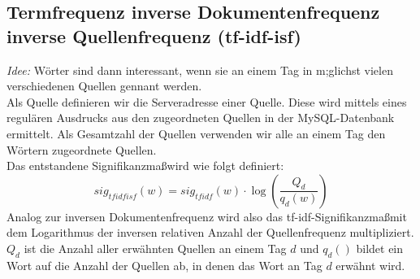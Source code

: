 \subsection{Termfrequenz inverse Dokumentenfrequenz inverse Quellenfrequenz (tf-idf-isf)}
\emph{Idee: } W\"orter sind dann interessant, wenn sie an einem Tag in m;glichst vielen verschiedenen Quellen gennant werden.\\
Als Quelle definieren wir die Serveradresse einer Quelle. Diese wird mittels eines regul\"aren Ausdrucks aus den zugeordneten Quellen in der MySQL-Datenbank ermittelt. Als Gesamtzahl der Quellen verwenden wir alle an einem Tag den W\"ortern zugeordnete Quellen.\\
Das entstandene Signifikanzma\ss wird wie folgt definiert:
 \begin{equation}
sig_{tf idf isf}(w) = sig_{tf idf}(w) \cdot \log ( \frac{Q_d}{q_d(w)})
\end{equation}
Analog zur inversen Dokumentenfrequenz wird also das tf-idf-Signifikanzma\ss  mit dem Logarithmus der inversen relativen Anzahl der Quellenfrequenz multipliziert. $Q_d$ ist die Anzahl aller erw\"ahnten Quellen an einem Tag $d$ und $q_d()$ bildet ein Wort auf die Anzahl der Quellen ab, in denen das Wort an Tag $d$  erw\"ahnt wird. 
